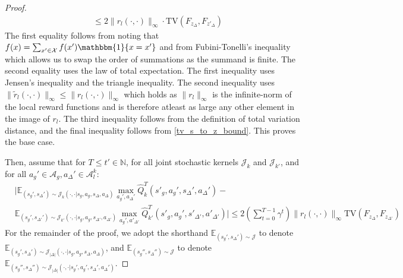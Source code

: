 \documentclass{article}
\theoremstyle{plain}
\theoremstyle{definition}
\def\E{\mathbb{E}}
\def\N{\mathbb{N}}
\begin{document}
\begin{proof}
\begin{align*}
&\leq  2\|r_l(\cdot,\cdot)\|_\infty \cdot \mathrm{TV}(F_{z_{\Delta}}, F_{z'_{\Delta}})
\end{align*}
The first equality follows from noting that $f(x)= \sum_{x'\in \mathcal{X}}f(x')\mathbbm{1}\{x=x'\}$ and from Fubini-Tonelli's inequality which allows us to swap the order of summations as the summand is finite. The second equality uses the law of total expectation. The first inequality uses Jensen's inequality and the triangle inequality. The second inequality uses $\|\tilde{r}_l(\cdot,\cdot)\|_\infty\leq \|r_l(\cdot,\cdot)\|_\infty$ which holds as $\|{r}_l\|_\infty$ is the infinite-norm of the local reward functions and is therefore atleast as large any other element in the image of $r_l$. The third inequality follows from the definition of total variation distance, and the final inequality follows from  \cref{tv_s_to_z_bound}. This proves the base case.

Then, assume that for $T\leq t'\in\N$, for all joint stochastic kernels $\mathcal{J}_k$ and $\mathcal{J}_{k'}$, and for all $a_g'\in \mathcal{A}_g, a_\Delta' \in \mathcal{A}_l^k$:
\begin{align*}
&\bigg|\E_{(s_g',s_\Delta')\sim\mathcal{J}_k(\cdot,\cdot|s_g,a_g,s_\Delta,a_\Delta)}\max_{a_g',a_\Delta'}\hat{Q}_k^T(s'_g,a_g',s_\Delta', a_\Delta')-\\
&\E_{(s_g',s_{\Delta'}')\sim\mathcal{J}_{k'}(\cdot,\cdot|s_g,a_g,s_{\Delta'}, a_{\Delta'})}\max_{a_g',a'_{\Delta'}}\hat{Q}_{k'}^T(s'_g,  a_g',s'_{\Delta'},a'_{\Delta'})\bigg| \leq 2\left (\sum_{t=0}^{T-1}\! \gamma^t\right)\!\|r_l(\cdot,\cdot)\|_\infty \mathrm{TV}(F_{z_\Delta}, F_{z_{\Delta'}})
\end{align*}
For the remainder of the proof, we adopt the shorthand $\E_{(s_g',s_\Delta')\sim{\mathcal{J}}}$ to denote $\E_{(s_g',s_\Delta')\sim\mathcal{J}_{|\Delta|}(\cdot,\cdot|s_g,a_g,s_\Delta,  a_\Delta)}$, and $\E_{(s_g'',s_\Delta'')\sim{\mathcal{J}}}$ to denote $\E_{(s_g'',s_\Delta'')\sim\mathcal{J}_{|\Delta|}(\cdot,\cdot|s_g',a_g',s_\Delta', a_\Delta')}$. 


\end{proof}
\end{document}
